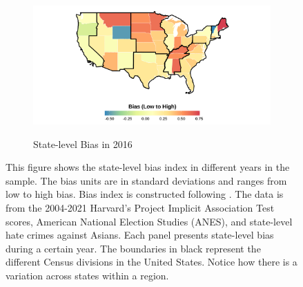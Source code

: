 \begin{center}
\begin{figure}[H]
\begin{subfigure}{.45\textwidth}
\label{fig:skiniat-map-2008}
\end{subfigure}
\hfill%
\begin{subfigure}{.45\textwidth}
\caption{State-level Bias in 2016}
\centering
\includegraphics[width=0.9\linewidth]{2016skinmap.png} 
\label{fig:skiniat-map-2010}
\end{subfigure}

\caption*{\footnotesize{This figure shows the state-level bias index in different years in the sample. The bias units are in standard deviations and ranges from low to high bias. Bias index is constructed following \textcite{lubotskyInterpretationRegressionsMultiple2006}. The data is from the 2004-2021 Harvard's Project Implicit Association Test scores, American National Election Studies (ANES), and state-level hate crimes against Asians. Each panel presents state-level bias during a certain year. The boundaries in black represent the different Census divisions in the United States. Notice how there is a variation across states within a region.}}
\end{figure}
\end{center}

\newpage
\pagebreak

